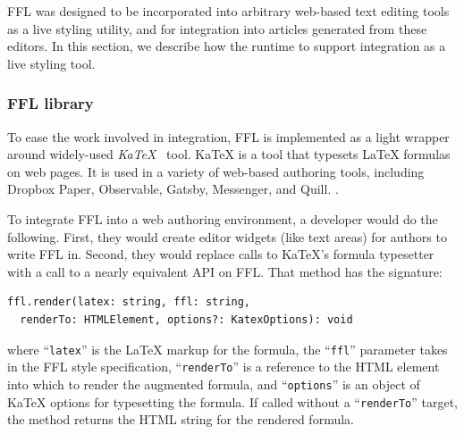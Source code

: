 FFL was designed to be incorporated into arbitrary web-based text editing tools as a live styling utility, and for integration into articles generated from these editors. In this section, we describe how the runtime to support integration as a live styling tool.


\subsubsection{FFL library}

To ease the work involved in integration, FFL is implemented as a light wrapper around widely-used \textit{KaTeX}~\cite{tool:katex} tool. KaTeX is a tool that typesets LaTeX formulas on web pages. It is used in a variety of web-based authoring tools, including Dropbox Paper, Observable, Gatsby, Messenger, and Quill. .

To integrate FFL into a web authoring environment, a developer would do the following. First, they would create editor widgets (like text areas) for authors to write FFL in. Second, they would replace calls to KaTeX's formula typesetter with a call to a nearly equivalent API on FFL. That method has the signature:

\begin{Verbatim}
ffl.render(latex: string, ffl: string,
  renderTo: HTMLElement, options?: KatexOptions): void
\end{Verbatim}
where ``\texttt{latex}'' is the LaTeX markup for the formula, the ``\texttt{ffl}'' parameter takes in the FFL style specification, ``\texttt{renderTo}'' is a reference to the HTML element into which to render the augmented formula, and ``\texttt{options}'' is an object of KaTeX options for typesetting the formula. If called without a ``\texttt{renderTo}'' target, the method returns the HTML string for the rendered formula.


